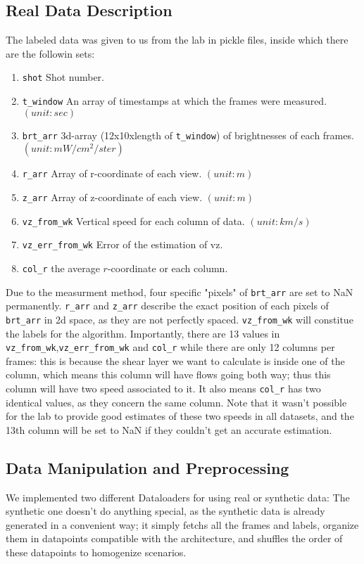 \documentclass[10pt,conference]{IEEEtran}
\begin{document}
\subsection{Real Data Description}
The labeled data was given to us from the lab in pickle files, inside which there are the followin sets:
\begin{enumerate}
  \item \texttt{shot} Shot number.
  \item \texttt{t\_window} An array of timestamps at which the frames were measured. $(unit: sec)$
  \item \texttt{brt\_arr} 3d-array (12x10xlength of \texttt{t\_window}) of brightnesses of each frames. $(unit: mW/cm^2/ster)$
  \item \texttt{r\_arr}  Array of r-coordinate of each view. $(unit: m)$
  \item \texttt{z\_arr}  Array of z-coordinate of each view. $(unit: m)$
  \item \texttt{vz\_from\_wk} Vertical speed for each column of data. $(unit: km/s)$
  \item \texttt{vz\_err\_from\_wk} Error of the estimation of vz.
  \item \texttt{col\_r} the average $r$-coordinate or each column.
\end{enumerate}
Due to the measurment method, four specific "pixels" of \texttt{brt\_arr} are set to NaN permanently. \texttt{r\_arr} and \texttt{z\_arr} describe the exact position of each pixels of \texttt{brt\_arr} in 2d space, as they are not perfectly spaced. \texttt{vz\_from\_wk} will constitue the labels for the algorithm. 
Importantly, there are 13 values in \texttt{vz\_from\_wk},\texttt{vz\_err\_from\_wk} and \texttt{col\_r} while there are only 12 columns per frames: this is because the shear layer we want to calculate is inside one of the column, which means this column will have flows going both way; thus this column will have two speed associated to it. It also means \texttt{col\_r} has two identical values, as they concern the same column.
Note that it wasn't possible for the lab to provide good estimates of these two speeds in all datasets, and the 13th column will be set to NaN if they couldn't get an accurate estimation. 
\subsection{Data Manipulation and Preprocessing}
We implemented two different Dataloaders for using real or synthetic data: The synthetic one doesn't do anything special, as the synthetic data is already generated in a convenient way; it simply fetchs all the frames and labels, organize them in datapoints compatible with the architecture, and shuffles the order of these datapoints to homogenize scenarios.
\end{document}
